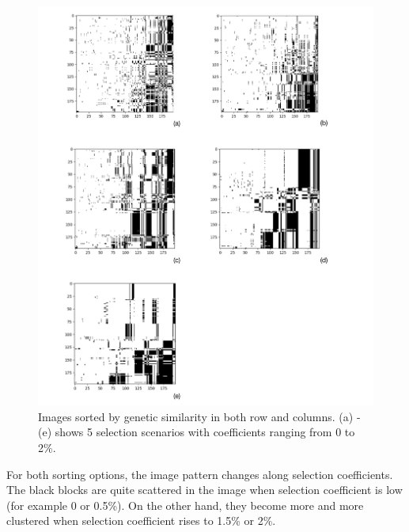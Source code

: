 \documentclass[a4paper,12pt,oneside]{extarticle}
\begin{document}
\begin{figure}[H] 
  \captionsetup{singlelinecheck = false, justification=justified}
  \centering
  \includegraphics[trim = 0 5mm 0 5mm, clip,width=1\textwidth]{figure4.png}
  \caption{Images sorted by genetic similarity in both row and columns. (a) - (e) shows 5 selection scenarios with coefficients ranging from 0 to 2\%.}
\end{figure}

For both sorting options, the image pattern changes along selection coefficients. The black blocks are quite scattered in the image when selection coefficient is low (for example 0 or 0.5\%). On the other hand, they become more and more clustered when selection coefficient rises to 1.5\% or 2\%.
\end{document}
